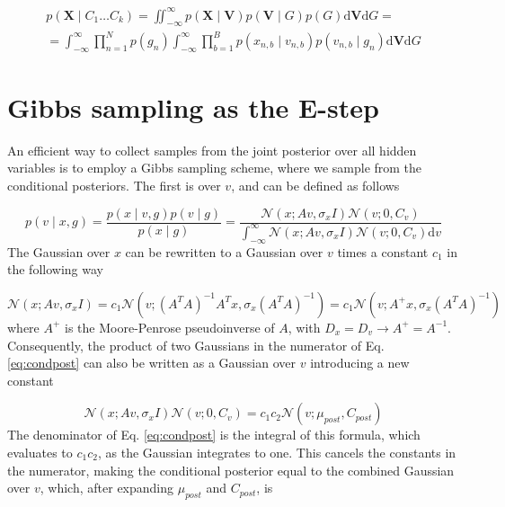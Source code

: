 \documentclass{paper}
\begin{document}
\begin{equation}
\begin{split}
p(\mathbf{X} \mid C_1 \dots C_k) = \iint_{-\infty}^{\infty} p(\mathbf{X} \mid \mathbf{V}) p(\mathbf{V} \mid G) p(G) \mathrm{d}\mathbf{V}\mathrm{d}G =\\
= \int_{-\infty}^{\infty} \prod_{n=1}^N p(g_n) \int_{-\infty}^{\infty} \prod_{b=1}^B p(x_{n,b} \mid v_{n,b}) p(v_{n,b} \mid g_n) \mathrm{d}\mathbf{V}\mathrm{d}G
\end{split}
\end{equation}

\section{Gibbs sampling as the E-step}

An efficient way to collect samples from the joint posterior over all hidden variables is to employ a Gibbs sampling scheme, where we sample from the conditional posteriors. The first is over $v$, and can be defined as follows

\begin{equation} \label{eq:condpost}
p(v \mid x,g) = \frac{p(x \mid v,g) p(v \mid g)}{p(x \mid g)} = \frac{\mathcal{N}(x;Av,\sigma_x I) \mathcal{N}(v;0,C_v)}{\int_{-\infty}^{\infty} \mathcal{N}(x;Av,\sigma_x I) \mathcal{N}(v;0,C_v) \mathrm{d}v}
\end{equation}
%
The Gaussian over $x$ can be rewritten to a Gaussian over $v$ times a constant $c_1$ in the following way

\begin{equation}
\mathcal{N}(x;Av,\sigma_x I) = c_1 \mathcal{N}(v; (A^T A)^{-1} A^T x, \sigma_x (A^T A)^{-1}) = c_1 \mathcal{N}(v; A^{+} x, \sigma_x (A^T A)^{-1})
\end{equation}
%
where $A^{+}$ is the Moore-Penrose pseudoinverse of $A$, with $D_x = D_v \rightarrow A^{+} = A^{-1}$. Consequently, the product of two Gaussians in the numerator of Eq. \ref{eq:condpost} can also be written as a Gaussian over $v$ introducing a new constant

\begin{equation}
\mathcal{N}(x;Av,\sigma_x I) \mathcal{N}(v;0,C_v) = c_1 c_2 \mathcal{N}(v; \mu_{post},C_{post})
\end{equation}
%
The denominator of Eq. \ref{eq:condpost} is the integral of this formula, which evaluates to $c_1c_2$, as the Gaussian integrates to one. This cancels the constants in the numerator, making the conditional posterior equal to the combined Gaussian over $v$, which, after expanding $\mu_{post}$ and $C_{post}$, is
\end{document}
